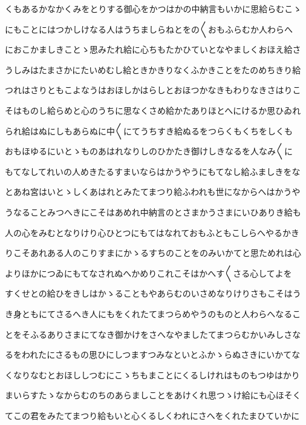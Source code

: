\documentclass[a4paper,11pt,landscape]{ltjtarticle}
\begin{document}
\par\medskip
くもあるかなかくみをとりする御心をかつはかの中納言もいかに思給らむこゝ
\par\medskip
にもことにはつかしけなる人はうちましらねとをの〱おもふらむか人わらへ
\par\medskip
におこかましきことゝ思みたれ給に心ちもたかひていとなやましくおほえ給さ
\par\medskip
うしみはたまさかにたいめむし給ときかきりなくふかきことをたのめちきり給
\par\medskip
つれはさりともこよなうはおほしかはらしとおほつかなきもわりなきさはりこ
\par\medskip
そはものし給らめと心のうちに思なくさめ給かたありほとへにけるか思ひゐれ
\par\medskip
られ給はぬにしもあらぬに中〱にてうちすき給ぬるをつらくもくちをしくも
\par\medskip
おもほゆるにいとゝものあはれなりしのひかたき御けしきなるを人なみ〱に
\par\medskip
もてなしてれいの人めきたるすまいならはかうやうにもてなし給ふましきをな
\par\medskip
とあね宮はいとゝしくあはれとみたてまつり給ふわれも世になからへはかうや
\par\medskip
うなることみつへきにこそはあめれ中納言のとさまかうさまにいひありき給も
\par\medskip
人の心をみむとなりけり心ひとつにもてはなれておもふともこしらへやるかき
\par\medskip
りこそあれある人のこりすまにかゝるすちのことをのみいかてと思ためれは心
\par\medskip
よりほかにつゐにもてなされぬへかめりこれこそはかへす〱さる心してよを
\par\medskip
すくせとの給ひをきしはかゝることもやあらむのいさめなりけりさもこそはう
\par\medskip
き身ともにてさるへき人にもをくれたてまつらめやうのものと人わらへなるこ
\par\medskip
とをそふるありさまにてなき御かけをさへなやましたてまつらむかいみしさな
\par\medskip
るをわれたにさるもの思ひにしつますつみなといとふかゝらぬさきにいかてな
\par\medskip
くなりなむとおほししつむにこゝちもまことにくるしけれはものもつゆはかり
\par\medskip
まいらすたゝなからむのちのあらましことをあけくれ思つゝけ給にも心ほそく
\par\medskip
てこの君をみたてまつり給もいと心くるしくわれにさへをくれたまひていかに
\par\medskip
\end{document}
